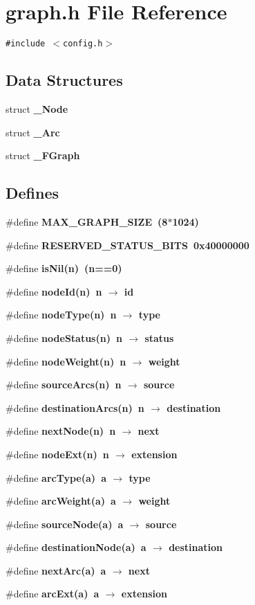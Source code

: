 \section{graph.h File Reference}
\label{graph_8h}
{\tt \#include $<$config.h$>$}\par
\subsection*{Data Structures}
\begin{CompactItemize}
\item 
struct \bf{\_\-Node}
\item 
struct \bf{\_\-Arc}
\item 
struct \bf{\_\-FGraph}
\end{CompactItemize}
\subsection*{Defines}
\begin{CompactItemize}
\item 
\#define \bf{MAX\_\-GRAPH\_\-SIZE}~(8$\ast$1024)
\item 
\#define \bf{RESERVED\_\-STATUS\_\-BITS}~0x40000000
\item 
\#define \bf{is\-Nil}(n)~(n==0)
\item 
\#define \bf{node\-Id}(n)~n $\rightarrow$ id
\item 
\#define \bf{node\-Type}(n)~n $\rightarrow$ type
\item 
\#define \bf{node\-Status}(n)~n $\rightarrow$ status
\item 
\#define \bf{node\-Weight}(n)~n $\rightarrow$ weight
\item 
\#define \bf{source\-Arcs}(n)~n $\rightarrow$ source
\item 
\#define \bf{destination\-Arcs}(n)~n $\rightarrow$ destination
\item 
\#define \bf{next\-Node}(n)~n $\rightarrow$ next
\item 
\#define \bf{node\-Ext}(n)~n $\rightarrow$ extension
\item 
\#define \bf{arc\-Type}(a)~a $\rightarrow$ type
\item 
\#define \bf{arc\-Weight}(a)~a $\rightarrow$ weight
\item 
\#define \bf{source\-Node}(a)~a $\rightarrow$ source
\item 
\#define \bf{destination\-Node}(a)~a $\rightarrow$ destination
\item 
\#define \bf{next\-Arc}(a)~a $\rightarrow$ next
\item 
\#define \bf{arc\-Ext}(a)~a $\rightarrow$ extension
\end{CompactItemize}
